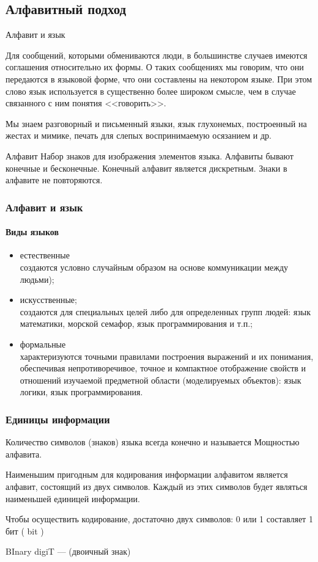  \subsection{Алфавитный подход}
\begin{frame}{Алфавит и язык}

 Для сообщений, которыми обмениваются люди, в большинстве случаев имеются соглашения относительно их формы.
О таких сообщениях мы говорим, что они передаются в языковой форме, что они составлены на некотором языке. При этом слово \alert{язык} используется в существенно более широком смысле, чем в случае связанного с ним понятия <<говорить>>. 

Мы знаем разговорный и письменный языки, язык глухонемых, построенный на жестах и мимике, печать для слепых
воспринимаемую осязанием и др.

\pause
\begin{block}{Алфавит}
 Набор знаков для изображения элементов языка. Алфавиты бывают конечные и бесконечные. Конечный алфавит является дискретным. Знаки в алфавите не повторяются.
\end{block}


\end{frame}


\begin{frame}
\frametitle{Алфавит и язык}
\framesubtitle{ Виды языков}

\begin{itemize}
	\item естественные \\создаются условно случайным образом на основе коммуникации между людьми);\pause
	\item искусственные;\\ создаются для специальных целей либо для определенных групп людей: язык математики, морской семафор, язык программирования и т.п.;\pause
	\item формальные\\характеризуются точными правилами построения выражений и их понимания, обеспечивая непротиворечивое, точное и компактное отображение свойств и отношений изучаемой предметной области (моделируемых объектов): язык логики, язык программирования.
\end{itemize}

\end{frame}

\begin{frame}
\frametitle{Единицы информации}

Количество символов (знаков) языка всегда конечно и называется \alert{Мощностью алфавита}.

Наименьшим пригодным для кодирования информации алфавитом является алфавит, состоящий из двух символов. Каждый из этих символов будет являться наименьшей единицей информации.
\pause

Чтобы осуществить кодирование, достаточно двух символов: 0 или 1  составляет 1 бит  ( bit )

BInary digiT --- (двоичный знак)
\end{frame}

